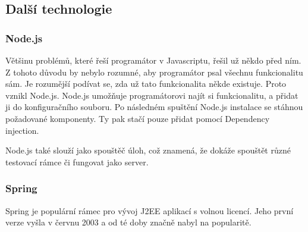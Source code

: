\documentclass[czech,master,public,dept460,male,cpdeclaration,twoside]{diploma}
\begin{document}
\subsection{Další technologie}

\subsubsection{Node.js}
Většinu problémů, které řeší programátor v Javascriptu, řešil už někdo před ním. Z tohoto důvodu by nebylo rozumné, aby programátor psal všechnu funkcionalitu sám. Je rozumější podívat se, zda už tato funkcionalita někde existuje. Proto vznikl Node.js. Node.js umožňuje programátorovi najít si funkcionalitu, a přidat ji do konfiguračního souboru. Po následném spuštění Node.js instalace se stáhnou požadované komponenty. Ty pak stačí pouze přidat pomocí Dependency injection.

Node.js také slouží jako spouštěč úloh, což znamená, že dokáže spouštět různé testovací rámce či fungovat jako server.

\subsubsection{Spring}
Spring je populární rámec pro vývoj J2EE aplikací s volnou licencí. Jeho první verze vyšla v červnu 2003 a od té doby značně nabyl na popularitě. 
\end{document}
